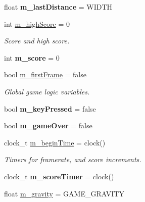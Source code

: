 \begin{DoxyCompactItemize}
float {\bfseries m\+\_\+last\+Distance} = W\+I\+D\+TH
\item 
\mbox{\label{class_game_a34102cab25af409643e0ab0f86027a9a}} 
int \mbox{\hyperlink{class_game_a34102cab25af409643e0ab0f86027a9a}{m\+\_\+high\+Score}} = 0
\begin{DoxyCompactList}\small\item\em Score and high score. \end{DoxyCompactList}\item 
\mbox{\label{class_game_a7c2f7dfc65fb47611b0a145138cf59b2}} 
int {\bfseries m\+\_\+score} = 0
\item 
\mbox{\label{class_game_a2f2686e263b39bdf81ef071363928581}} 
bool \mbox{\hyperlink{class_game_a2f2686e263b39bdf81ef071363928581}{m\+\_\+first\+Frame}} = false
\begin{DoxyCompactList}\small\item\em Global game logic variables. \end{DoxyCompactList}\item 
\mbox{\label{class_game_a17045a29463bb86ebde69d9584a2c29f}} 
bool {\bfseries m\+\_\+key\+Pressed} = false
\item 
\mbox{\label{class_game_a9a7a387339eb7cb24e7d81c48e96f766}} 
bool {\bfseries m\+\_\+game\+Over} = false
\item 
\mbox{\label{class_game_ab6548bdea5f609731a3a1616893329e1}} 
clock\+\_\+t \mbox{\hyperlink{class_game_ab6548bdea5f609731a3a1616893329e1}{m\+\_\+begin\+Time}} = clock()
\begin{DoxyCompactList}\small\item\em Timers for framerate, and score increments. \end{DoxyCompactList}\item 
\mbox{\label{class_game_a19eb63c3b67044de77c3e91b605d1aa8}} 
clock\+\_\+t {\bfseries m\+\_\+score\+Timer} = clock()
\item 
\mbox{\label{class_game_a9c9496efddab7f0270b82cc9294cce91}} 
float \mbox{\hyperlink{class_game_a9c9496efddab7f0270b82cc9294cce91}{m\+\_\+gravity}} = G\+A\+M\+E\+\_\+\+G\+R\+A\+V\+I\+TY

\end{DoxyCompactItemize}
